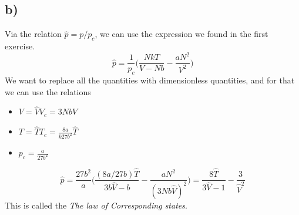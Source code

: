 \documentclass{scrartcl}
\begin{document}
\subsection*{b)}
Via the relation $\hat{p}=p/p_c$, we can use the expression we found in the first exercise.
\begin{equation}
\hat{p}=\frac{1}{p_c}\bigg(\frac{NkT}{V-Nb}-\frac{aN^2}{V^2}\bigg)
\label{eq:p(V)}
\end{equation}
We want to replace all the quantities with dimensionless quantities, and for that we can use the relations
\begin{itemize}
\item $V=\hat{V}V_c=3Nb\hat{V}$
\item $T=\hat{T}T_c=\frac{8a}{k27b^2}\hat{T}$
\item $p_c=\frac{a}{27b^2}$
\end{itemize}
\begin{equation}
\hat{p}=\frac{27b^2}{a}\bigg(\frac{(8a/27b)\hat{T}}{3b\hat{V}-b}-\frac{aN^2}{(3Nb\hat{V})^2}\bigg)=\frac{8\hat{T}}{3\hat{V}-1}-\frac{3}{\hat{V}^2}
\end{equation}
This is called the \textit{The law of Corresponding states}. 
\end{document}
